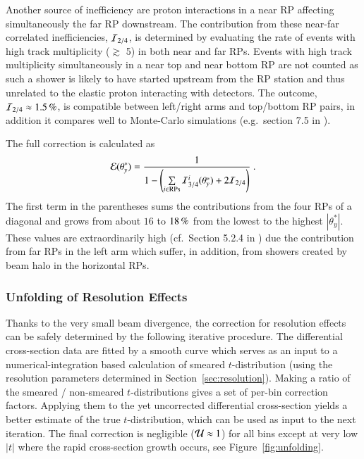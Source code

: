 Another source of inefficiency are proton interactions in a near RP affecting simultaneously the far RP downstream. The contribution from these near-far correlated inefficiencies, ${\cal I}_{2/4}$, is determined by evaluating the rate of events with high track multiplicity ($\gtrsim$ 5) in both near and far RPs. Events with high track multiplicity simultaneously in a near top and near bottom RP are not counted as such a shower is likely to have started upstream from the RP station and thus unrelated to the elastic proton interacting with detectors. The outcome, ${\cal I}_{2/4} \approx 1.5\un{\%}$, is compatible between left/right arms and top/bottom RP pairs, in addition it compares well to Monte-Carlo simulations (e.g.~section 7.5 in \cite{hubert-thesis}).

The full correction is calculated as
\begin{equation}
\label{efficiency}
	{\cal E}(\theta_y^*) = {1\over 1 - \left( \sum\limits_{i\in \rm RPs} {\cal I}^i_{3/4}(\theta_y^*) + 2 {\cal I}_{2/4} \right) } \ .
\end{equation}
The first term in the parentheses sums the contributions from the four RPs of a diagonal and grows from about $16$ to $18\,{\rm \%}$ from the lowest to the highest $|\theta_y^*|$. These values are extraordinarily high (cf.~Section 5.2.4 in \cite{8tev-90m}) due the contribution from far RPs in the left arm which suffer, in addition, from showers created by beam halo in the horizontal RPs.

\subsubsection{Unfolding of Resolution Effects}
\label{sec:unfolding}

Thanks to the very small beam divergence, the correction for resolution effects can be safely determined by the following iterative procedure. The differential cross-section data are fitted by a smooth curve which serves as an input to a numerical-integration based calculation of smeared $t$-distribution (using the resolution parameters determined in Section~\ref{sec:resolution}). Making a ratio of the smeared / non-smeared $t$-distributions gives a set of per-bin correction factors. Applying them to the yet uncorrected differential cross-section yields a better estimate of the true $t$-distribution, which can be used as input to the next iteration. The final correction is negligible (${\cal U} \approx 1$) for all bins except at very low $|t|$ where the rapid cross-section growth occurs, see Figure~\ref{fig:unfolding}.


